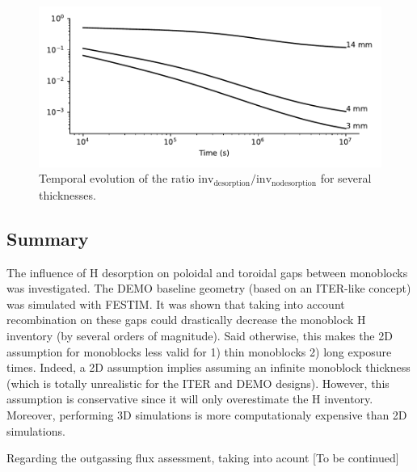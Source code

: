 \begin{figure} [h]
    \centering
    \includegraphics[width=\linewidth]{Figures/Chapter3/monoblocks/3D_monoblocks/influence_of_thickness.pdf}
    \caption{Temporal evolution of the ratio $\mathrm{inv}_\mathrm{desorption} / \mathrm{inv}_\mathrm{no desorption}$ for several thicknesses.}
    \label{fig: ratio 3D thickness monoblock}
\end{figure}

\subsection{Summary}
The influence of H desorption on poloidal and toroidal gaps between monoblocks was investigated.
The DEMO baseline geometry (based on an ITER-like concept) was simulated with FESTIM.
It was shown that taking into account recombination on these gaps could drastically decrease the monoblock H inventory (by several orders of magnitude).
Said otherwise, this makes the 2D assumption for monoblocks less valid for 1) thin monoblocks 2) long exposure times.
Indeed, a 2D assumption implies assuming an infinite monoblock thickness (which is totally unrealistic for the ITER and DEMO designs).
However, this assumption is conservative since it will only overestimate the H inventory.
Moreover, performing 3D simulations is more computationaly expensive than 2D simulations.

Regarding the outgassing flux assessment, taking into acount
[To be continued]
